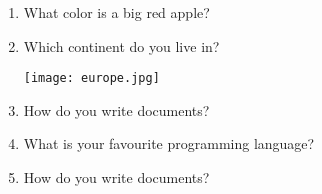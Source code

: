 \documentclass[12pt,onside,a4paper,article]{memoir}
\begin{document}
\begin{enumerate}
\setcounter{page}{1}


\item{What color is a big red apple?}
\begin{flushright}
\vspace{3cm}

\end{flushright}

\item{Which continent do you live in?}
\begin{flushright}
\vspace{3cm}

\end{flushright}
\begin{flushleft}
\texttt{[image: europe.jpg]}
\end{flushleft}

\item{How do you write documents?}
\begin{flushright}
\vspace{3cm}

\end{flushright}

\item{What is your favourite programming language?}
\begin{flushright}
\vspace{3cm}

\end{flushright}

\item{How do you write documents?}
\begin{flushright}
\vspace{3cm}


\end{flushright}
\end{enumerate}
\end{document}
